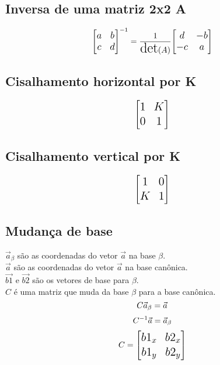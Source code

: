 \documentclass[10pt, a4paper, oneside]{book}
\begin{document}
\subsection{Inversa de uma matriz 2x2 A}
\begin{equation*} 
\large{
\begin{bmatrix}
    a & b \\
    c & d
\end{bmatrix}^{-1} =
\LARGE{\frac{1}{\text{det}(A)}}
\large{
\begin{bmatrix}
    d & -b \\
    -c & a
\end{bmatrix}
}
}
\end{equation*}

\subsection{Cisalhamento horizontal por K}
\begin{equation*} 
\Large{
\begin{bmatrix}
    1 & K \\
    0 & 1
\end{bmatrix}
}
\end{equation*}

\subsection{Cisalhamento vertical por K}
\begin{equation*} 
\Large{
\begin{bmatrix}
    1 & 0 \\
    K & 1
\end{bmatrix}
}
\end{equation*}

\subsection{Mudança de base}
\Large {$\vec{a}_\beta$ são as coordenadas do vetor $\vec{a}$ na base $\beta$.\\}
\Large {$\vec{a}$ são as coordenadas do vetor $\vec{a}$ na base canônica.\\}
\Large {$\vec{b1}$ e $\vec{b2}$ são os vetores de base para $\beta$.\\}
\Large {$C$ é uma matriz que muda da base $\beta$ para a base canônica.}
\begin{equation*}
\Large{C \vec{a}_\beta = \vec{a}}
\end{equation*} 
\begin{equation*}
\Large{C^{-1} \vec{a} = \vec{a}_\beta}
\end{equation*} 
\begin{equation*} 
\Large{
C = 
\begin{bmatrix}
    b1_x & b2_x \\
    b1_y & b2_y
\end{bmatrix}
}
\end{equation*}
\end{document}
